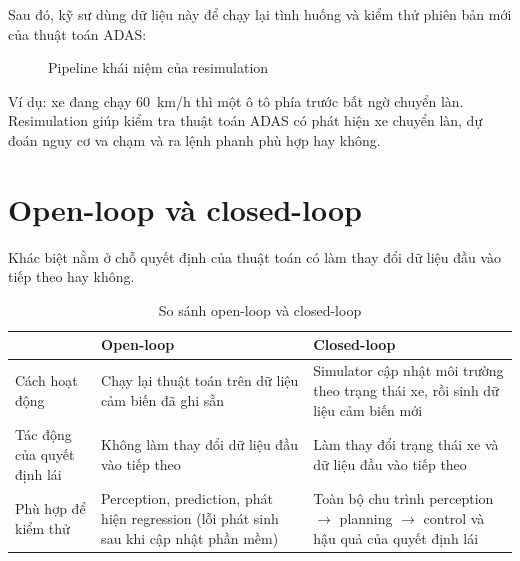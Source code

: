 Sau đó, kỹ sư dùng dữ liệu này để chạy lại tình huống và kiểm thử phiên bản mới của thuật toán ADAS:

\begin{figure}[H]
  \centering
  \caption{Pipeline khái niệm của resimulation}
\end{figure}

Ví dụ: xe đang chạy 60~km/h thì một ô tô phía trước bất ngờ chuyển làn.
Resimulation giúp kiểm tra thuật toán ADAS có phát hiện xe chuyển làn, dự đoán nguy cơ va chạm và ra lệnh phanh phù hợp hay không.

\section{Open-loop và closed-loop}

Khác biệt nằm ở chỗ quyết định của thuật toán có làm thay đổi dữ liệu đầu vào tiếp theo hay không.

\begin{table}[H]
  \centering
  \caption{So sánh open-loop và closed-loop}
  \begin{tabularx}{\linewidth}{>{\raggedright\arraybackslash}p{2.6cm} X X}
    \toprule
     & \textbf{Open-loop} & \textbf{Closed-loop} \\
    \midrule
    Cách hoạt động & Chạy lại thuật toán trên dữ liệu cảm biến đã ghi sẵn & Simulator cập nhật môi trường theo trạng thái xe, rồi sinh dữ liệu cảm biến mới \\
    \addlinespace
    Tác động của quyết định lái & Không làm thay đổi dữ liệu đầu vào tiếp theo & Làm thay đổi trạng thái xe và dữ liệu đầu vào tiếp theo \\
    \addlinespace
    Phù hợp để kiểm thử & Perception, prediction, phát hiện regression (lỗi phát sinh sau khi cập nhật phần mềm) & Toàn bộ chu trình perception $\to$ planning $\to$ control và hậu quả của quyết định lái \\
    \bottomrule
  \end{tabularx}
\end{table}

